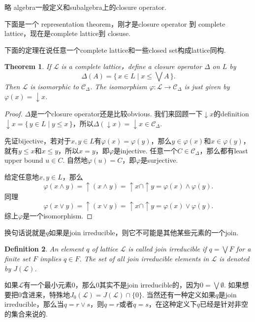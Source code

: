 \documentclass{article}
\newtheorem{theorem}{Theorem}[section]
\newtheorem{definition}[theorem]{Definition}
\newcommand*{\xfunc}[4]{{#2}\colon{#3}{#1}{#4}}
\newcommand*{\func}[3]{\xfunc{\to}{#1}{#2}{#3}}
\newcommand\Set[2]{\{\,#1\mid#2\,\}} %
\newcommand\lattice{\mathcal{L}}
\begin{document}
略{\color{red} algebra一般定义和subalgebra上的closure operator}.

下面是一个{\color{red} representation theorem，刚才是closure operator 到 complete lattice，现在是complete lattice到 closuse}.

{\color{blue} 下面的定理在说任意一个complete lattice和一些closed set构成lattice同构}.

\begin{theorem}
\rm If $\lattice$ is a complete lattice，define a closure operator $\Delta$ on $L$ by
$$
\Delta(A) = \Set{x \in L}{x \leq \bigvee A}.
$$
Then {\color{red} $\lattice$ is isomorphic to $\mathcal{C}_{\Delta}$}. The isomorphism $\func{\varphi}{\lattice}{\mathcal{C}_{\Delta}}$ is just given by $\varphi(x) = \downarrow x$.
\end{theorem}

\begin{proof}
$\Delta$是一个closure operator还是比较obvious. 我们来回顾一下$\downarrow x$的definition $\downarrow x = \Set{y \in L}{ y \leq x}$，所以$\Delta(\downarrow x) = \downarrow x \in \mathcal{C}_{\Delta}$.

先证bijective，若对于$x,y \in L$有$\varphi(x) = \varphi(y)$，那么$y \in \varphi(x)$和$x \in \varphi(y)$，就有$y \leq x$和$x \leq y$，所以$x = y$，即$\varphi$是injective. 任意一个$C \in \mathcal{C}_{\Delta}$，那么都有least upper bound $u \in C$. 自然地$\varphi(u) = C$，即$\varphi$是surjective.

给定任意地$x,y \in L$，那么
$$
\varphi(x \wedge y) = \uparrow (x \wedge y) = \uparrow x \cap \uparrow y = \varphi(x) \wedge \varphi(y).
$$
同理
$$
\varphi(x \vee y) = \uparrow (x \vee y) = \uparrow x \cap \uparrow y = \varphi(x) \vee \varphi(y).
$$
综上$\varphi$是一个isomorphism.
\end{proof}


{\color{blue} 换句话说就是$q$如果是join irreducible，则它不可能是其他某些元素的一个join}. 

\begin{definition}
\rm An element $q$ of lattice $\lattice$ is called {\color{red} join irreducible} if $q = \bigvee F$ for a {\color{red} finite set} $F$ implies $q \in F$. The set of all join irreducible elements in $\lattice$ is denoted by $J(\lattice)$.
\end{definition}

{\color{red} 如果$\lattice$有一个最小元素0，那么0其实不是join irreducible的，因为$0 = \bigvee \emptyset$. 如果想要把0含进来，特殊地$J_0(\lattice) =J(\lattice) \cap \{0\}$. 当然还有一种定义如果$q$是join irreducible，那么当$q = r \vee s$，则$q = r$或者$q =s$，在这种定义下$q$已经是针对非空的集合来说的}. 
\end{document}
